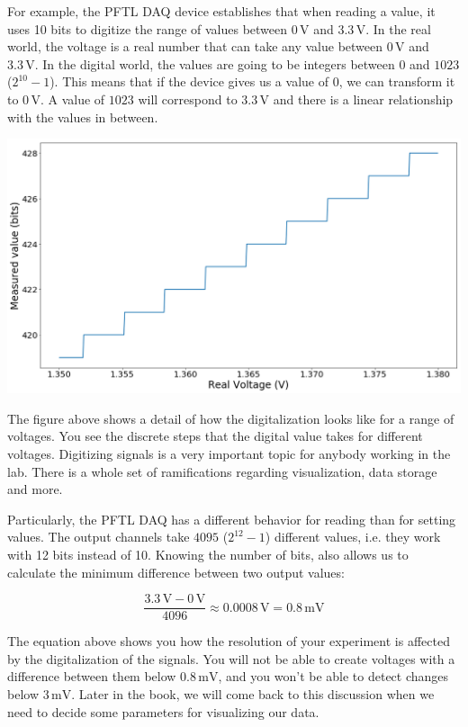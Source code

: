 For example, the {PFTL DAQ} device establishes that when reading a value, it uses 10 bits to digitize the range of values between $0\,\textrm{V}$ and $3.3\,\textrm{V}$. In the real world, the voltage is a real number that can take any value between $0\,\textrm{V}$ and $3.3\,\textrm{V}$. In the digital world, the values are going to be integers between $0$ and $1023$ ($2^{10}-1$). This means that if the device gives us a value of $0$, we can transform it to $0\,\textrm{V}$. A value of $1023$ will correspond to $3.3\,\textrm{V}$ and there is a linear relationship with the values in between. 

\begin{center}
\includegraphics[width=.6\textwidth]{images/Chapter_03/digitalization.png}
\end{center}

The figure above shows a detail of how the digitalization looks like for a range of voltages. You see the discrete steps that the digital value takes for different voltages. Digitizing signals is a very important topic for anybody working in the lab. There is a whole set of ramifications regarding visualization, data storage and more. 

Particularly, the {PFTL DAQ} has a different behavior for reading than for setting values. The output channels take $4095$ ($2^{12}-1$) different values, i.e. they work with 12 bits instead of 10. Knowing the number of bits, also allows us to calculate the minimum difference between two output values:

\begin{equation}
 \frac{3.3\,\textrm{V} - 0\,\textrm{V}}{4096} \approx 0.0008\,\textrm{V} = 0.8\,\textrm{mV}
\end{equation}

The equation above shows you how the resolution of your experiment is affected by the digitalization of the signals. You will not be able to create voltages with a difference between them below $0.8\,\textrm{mV}$, and you won't be able to detect changes below $3\,\textrm{mV}$. Later in the book, we will come back to this discussion when we need to decide some parameters for visualizing our data. 

